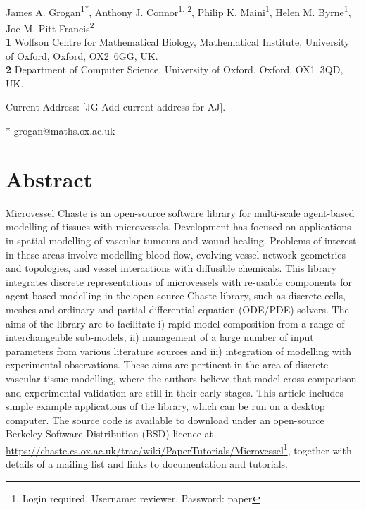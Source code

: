 \documentclass[10pt,letterpaper]{article}
\date{}
\begin{document}
\vspace*{0.2in}

\begin{flushleft}
{\Large
\textbf{} %
}
\newline
\\
James A. Grogan\textsuperscript{1*},
Anthony J. Connor\textsuperscript{1, 2\textcurrency},
Philip K. Maini\textsuperscript{1},
Helen M. Byrne\textsuperscript{1},
Joe M. Pitt-Francis\textsuperscript{2}
\\
\bigskip
\textbf{1} Wolfson Centre for Mathematical Biology, Mathematical Institute, University of Oxford, Oxford, \mbox{OX2 6GG}, UK.
\\
\textbf{2} Department of Computer Science, University of Oxford, Oxford, \mbox{OX1 3QD}, UK.
\\
\bigskip

\textcurrency Current Address: [JG Add current address for AJ].

* grogan@maths.ox.ac.uk

\end{flushleft}

\section*{Abstract}
Microvessel Chaste is an open-source software library for multi-scale agent-based modelling of tissues with microvessels. Development has focused on applications in spatial modelling of vascular tumours and wound healing. Problems of interest in these areas involve modelling blood flow, evolving vessel network geometries and topologies, and vessel interactions with diffusible chemicals. This library integrates discrete representations of microvessels with re-usable components for agent-based modelling in the open-source Chaste library, such as discrete cells, meshes and ordinary and partial differential equation (ODE/PDE) solvers. The aims of the library are to facilitate i) rapid model composition from a range of interchangeable sub-models, ii) management of a large number of input parameters from various literature sources and iii) integration of modelling with experimental observations. These aims are pertinent in the area of discrete vascular tissue modelling, where the authors believe that model cross-comparison and experimental validation are still in their early stages. This article includes simple example applications of the library, which can be run on a desktop computer. The source code is available to download under an open-source Berkeley Software Distribution (BSD) licence at \url{https://chaste.cs.ox.ac.uk/trac/wiki/PaperTutorials/Microvessel}\footnote{Login required. Username: reviewer. Password: paper}, together with details of a mailing list and links to documentation and tutorials.
\end{document}
